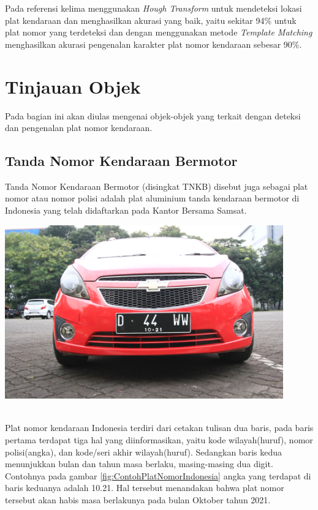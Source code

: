 \noindent Pada referensi kelima \cite{rasheed} menggunakan \textit{Hough Transform} untuk mendeteksi lokasi plat kendaraan dan menghasilkan akurasi yang baik, yaitu sekitar 94\% untuk plat nomor yang terdeteksi dan dengan menggunakan metode \textit{Template Matching} menghasilkan akurasi pengenalan karakter plat nomor kendaraan sebesar 90\%.\\

\section{Tinjauan Objek}
\noindent Pada bagian ini akan diulas mengenai objek-objek yang terkait dengan deteksi dan pengenalan plat nomor kendaraan.\\

\subsection{Tanda Nomor Kendaraan Bermotor}
\noindent Tanda Nomor Kendaraan Bermotor (disingkat TNKB) disebut juga sebagai plat nomor atau nomor polisi adalah plat aluminium tanda kendaraan bermotor di Indonesia yang telah didaftarkan pada Kantor Bersama Samsat.

\begin{adjustbox}{width=1\textwidth}
\noindent\begin{minipage}{\linewidth}
	\centering\includegraphics[width=12cm]{images/plat_nomor_example.png}
	\label{fig:ContohPlatNomorIndonesia}
\end{minipage}
\end{adjustbox}\\

\noindent Plat nomor kendaraan Indonesia terdiri dari cetakan tulisan dua baris, pada baris pertama terdapat tiga hal yang diinformasikan, yaitu kode wilayah(huruf), nomor polisi(angka), dan kode/seri akhir wilayah(huruf). Sedangkan baris kedua menunjukkan bulan dan tahun masa berlaku, masing-masing dua digit. Contohnya pada gambar \ref{fig:ContohPlatNomorIndonesia} angka yang terdapat di baris keduanya adalah 10.21. Hal tersebut menandakan bahwa plat nomor tersebut akan habis masa berlakunya pada bulan Oktober tahun 2021.

